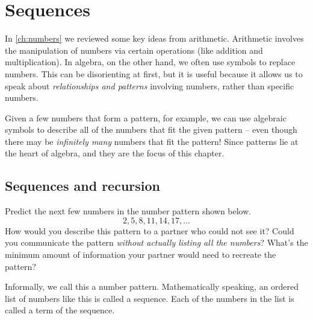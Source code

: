 \chapter{Sequences}
\label{ch:sequences}


In \cref{ch:numbers} we reviewed some key ideas from arithmetic. Arithmetic involves the manipulation of numbers via certain operations (like addition and multiplication). In algebra, on the other hand, we often use symbols to replace numbers. This can be disorienting at first, but it is useful because it allows us to speak about \textit{relationships and patterns} involving numbers, rather than specific numbers.

Given a few numbers that form a pattern, for example, we can use algebraic symbols to describe all of the numbers that fit the given pattern -- even though there may be \textit{infinitely many} numbers that fit the pattern! Since patterns lie at the heart of algebra, and they are the focus of this chapter.

\newif\iffractals
\fractalstrue

\section{Sequences and recursion}
\label{sec:recursion}

\begin{boxedexplore}
Predict the next few numbers in the number pattern shown below.
\[2, 5, 8, 11, 14, 17, \dotsc\]
How would you describe this pattern to a partner who could not see it? Could you communicate the pattern \textit{without actually listing all the numbers}? What's the minimum amount of information your partner would need to recreate the pattern?
\end{boxedexplore}

Informally, we call this a number pattern. Mathematically speaking, an ordered list of numbers like this is called a \gls{sequence}. Each of the numbers in the list is called a \gls{term} of the sequence.



